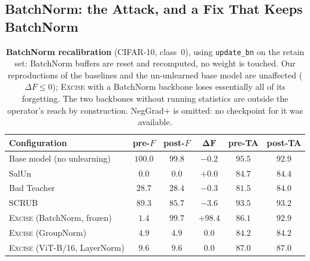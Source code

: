 \documentclass{article}
\newcommand{\ours}{\textsc{Excise}}
\newcommand{\rev}[1]{{\color{revisedB}#1}}
\theoremstyle{remark}
\theoremstyle{plain}
\begin{document}
\subsection{BatchNorm: the Attack, and a Fix That Keeps BatchNorm}\label{sec:bn_results}

\begin{table}[t]
\centering
\caption{\textbf{BatchNorm recalibration} (CIFAR-10, class~0), using
\texttt{update\_bn} on the retain set: BatchNorm buffers are reset and
recomputed, no weight is touched. \rev{Our reproductions of the baselines}
and the un-unlearned base model are unaffected ($\Delta F \le 0$); \ours{} with a
BatchNorm backbone loses essentially all of its forgetting. The two backbones without running statistics
are outside the operator's reach by construction. NegGrad+ is omitted: no
checkpoint for it was available.}
\label{tab:bnrecal}
\begin{tabular}{@{}lccccc@{}}
\toprule
Configuration & pre-$F$ & post-$F$ & $\boldsymbol{\Delta F}$ & pre-TA & post-TA \\
\midrule
Base model (no unlearning)  & $100.0$ & $99.8$ & $-0.2$ & $95.5$ & $92.9$ \\
SalUn                       & $0.0$   & $0.0$  & $+0.0$ & $84.7$ & $84.4$ \\
Bad Teacher                 & $28.7$  & $28.4$ & $-0.3$ & $81.5$ & $84.0$ \\
SCRUB                       & $89.3$  & $85.7$ & $-3.6$ & $93.5$ & $93.2$ \\
\midrule
\ours{} (BatchNorm, frozen) & $1.4$   & $99.7$ & $\mathbf{+98.4}$ & $86.1$ & $92.9$ \\
\ours{} (GroupNorm)         & $4.9$   & $4.9$  & $\mathbf{0.0}$   & $84.2$ & $84.2$ \\
\ours{} (ViT-B/16, LayerNorm) & $9.6$ & $9.6$  & $\mathbf{0.0}$   & $87.0$ & $87.0$ \\
\bottomrule
\end{tabular}
\end{table}
\end{document}
